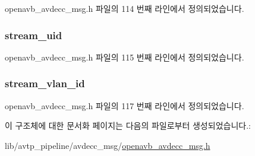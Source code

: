 openavb\+\_\+avdecc\+\_\+msg.\+h 파일의 114 번째 라인에서 정의되었습니다.

\subsubsection[{\texorpdfstring{stream\+\_\+uid}{stream_uid}}]{ stream\+\_\+uid}\hypertarget{structopenavb_avdecc_msg_params___c2_s___talker_stream_i_d__t_a511b2a26fe61b945ced1dd0bab9f2d1b}{}\label{structopenavb_avdecc_msg_params___c2_s___talker_stream_i_d__t_a511b2a26fe61b945ced1dd0bab9f2d1b}


openavb\+\_\+avdecc\+\_\+msg.\+h 파일의 115 번째 라인에서 정의되었습니다.

\subsubsection[{\texorpdfstring{stream\+\_\+vlan\+\_\+id}{stream_vlan_id}}]{ stream\+\_\+vlan\+\_\+id}\hypertarget{structopenavb_avdecc_msg_params___c2_s___talker_stream_i_d__t_a31db70d552fc6f5d35875430fca593e6}{}\label{structopenavb_avdecc_msg_params___c2_s___talker_stream_i_d__t_a31db70d552fc6f5d35875430fca593e6}


openavb\+\_\+avdecc\+\_\+msg.\+h 파일의 117 번째 라인에서 정의되었습니다.



이 구조체에 대한 문서화 페이지는 다음의 파일로부터 생성되었습니다.\+:\begin{DoxyCompactItemize}
\item 
lib/avtp\+\_\+pipeline/avdecc\+\_\+msg/\hyperlink{openavb__avdecc__msg_8h}{openavb\+\_\+avdecc\+\_\+msg.\+h}\end{DoxyCompactItemize}
